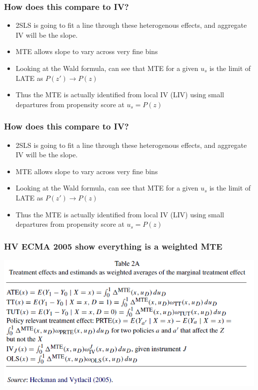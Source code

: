 \begin{frame}
  \footnotesize
  \frametitle{How does this compare to IV?}
  \begin{itemize}
    \item 2SLS is going to fit a line through these heterogenous effects, and aggregate IV will be the slope. 
    \item MTE allows slope to vary across very fine bins 
    \item Looking at the Wald formula, can see that MTE for a given $u_s$ is the limit of LATE as $P(z') \rightarrow P(z)$ 
    \item Thus the MTE is actually identified from local IV (LIV) using small departures from propensity score at $u_{s} = P(z)$
  \end{itemize}
\end{frame}

\begin{frame}
  \footnotesize
  \frametitle{How does this compare to IV?}
  \begin{itemize}
    \item 2SLS is going to fit a line through these heterogenous effects, and aggregate IV will be the slope. 
    \item MTE allows slope to vary across very fine bins 
    \item Looking at the Wald formula, can see that MTE for a given $u_s$ is the limit of LATE as $P(z') \rightarrow P(z)$ 
    \item Thus the MTE is actually identified from local IV (LIV) using small departures from propensity score at $u_{s} = P(z)$
  \end{itemize}
\end{frame}

\begin{frame}
  \frametitle{HV ECMA 2005 show everything is a weighted MTE}
  \begin{center}
    \includegraphics[width=\textwidth]{./resources/HVMTEmap}
  \end{center}  
\end{frame}

